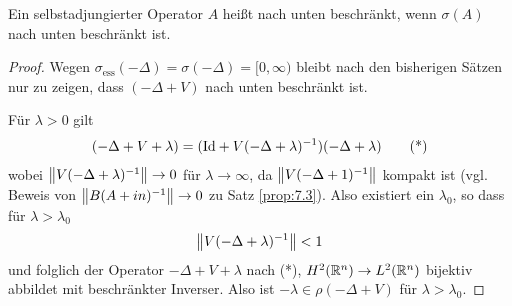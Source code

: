 \begin{bem*}
Ein selbstadjungierter Operator $A$ heißt nach unten beschränkt, wenn
$\sigma(A)$ nach unten beschränkt ist.\maphere
\end{bem*}

\begin{proof}
Wegen $\sigma_\mathrm{ess}(-\Delta) = \sigma(-\Delta) = [0,\infty)$ bleibt nach
den bisherigen Sätzen nur zu zeigen, dass $(-\Delta+ V)$ nach unten beschränkt
ist.

Für $\lambda > 0$ gilt
\begin{align*}
(-\Delta + V + \lambda) = (\mathrm{Id} + V(-\Delta + \lambda)^{-1})(-\Delta
+\lambda)\tag{*}
\end{align*}
wobei $\left\|V(-\Delta+\lambda)^{-1}\right\|\to 0$ für $\lambda\to \infty$, da
$\left\|V(-\Delta+1)^{-1}\right\|$ kompakt ist (vgl. Beweis von
$\left\|B(A+in)^{-1}\right\| \to 0$ zu Satz \ref{prop:7.3}). Also existiert ein
$\lambda_0$, so dass für $\lambda > \lambda_0$
\begin{align*}
\left\|V(-\Delta + \lambda)^{-1}\right\| < 1
\end{align*}
und folglich der Operator $-\Delta+V+\lambda$ nach (*), $H^2(\mathbb{R}^n)\to
L^2(\mathbb{R}^n)$ bijektiv abbildet mit beschränkter Inverser. Also ist
$-\lambda\in\rho(-\Delta+V)$ für $\lambda > \lambda_0$.\qedhere
\end{proof}


